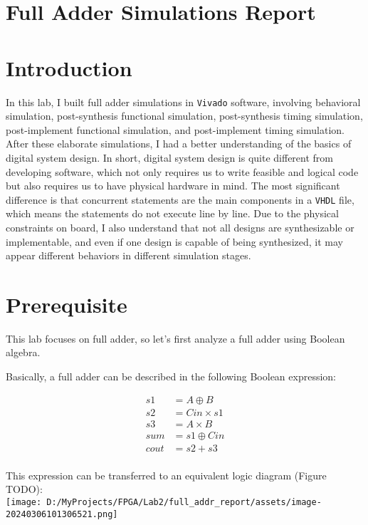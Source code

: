 \documentclass[
]{article}
\author{}
\date{}
\begin{document}
\hypertarget{full-adder-simulations-report}{%
\section{Full Adder Simulations
Report}\label{full-adder-simulations-report}}

\hypertarget{introduction}{%
\section{Introduction}\label{introduction}}

In this lab, I built full adder simulations in \texttt{Vivado} software,
involving behavioral simulation, post-synthesis functional simulation,
post-synthesis timing simulation, post-implement functional simulation,
and post-implement timing simulation. After these elaborate simulations,
I had a better understanding of the basics of digital system design. In
short, digital system design is quite different from developing
software, which not only requires us to write feasible and logical code
but also requires us to have physical hardware in mind. The most
significant difference is that concurrent statements are the main
components in a \texttt{VHDL} file, which means the statements do not
execute line by line. Due to the physical constraints on board, I also
understand that not all designs are synthesizable or implementable, and
even if one design is capable of being synthesized, it may appear
different behaviors in different simulation stages.

\hypertarget{prerequisite}{%
\section{Prerequisite}\label{prerequisite}}

This lab focuses on full adder, so let's first analyze a full adder
using Boolean algebra.

Basically, a full adder can be described in the following Boolean
expression:

\begin{align*}
s1&=A\oplus B\\
s2&=Cin\times s1\\
s3&=A\times B\\
sum&=s1\oplus Cin\\
cout&=s2 + s3\\
\end{align*}

This expression can be transferred to an equivalent logic diagram
(Figure TODO):\\
\texttt{[image: D:/MyProjects/FPGA/Lab2/full\_addr\_report/assets/image-20240306101306521.png]}
\end{document}

